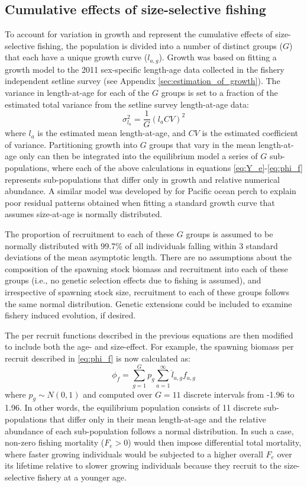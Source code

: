 \subsection*{Cumulative effects of size-selective fishing} %
\label{sub:cumulative_effects_of_size_selective_fishing}
To account for variation in growth and represent the cumulative effects of size-selective fishing, the population is divided into a number of distinct groups ($G$) that each have a unique growth curve ($l_{a,g}$).  Growth was based on fitting a growth model to the 2011 sex-specific length-age data collected in the fishery independent setline survey (see Appendix \ref{sec:estimation_of_growth}). The variance in length-at-age for each of the $G$ groups is set to a fraction of the estimated total variance from  the setline survey length-at-age data:
\[
 \sigma_{l_a}^2 = \frac{1}{G} (l_a CV)^2
\]
where $l_a$ is the estimated mean length-at-age, and $CV$ is the estimated coefficient of variance.  Partitioning growth  into $G$  groups that vary in the mean length-at-age only can then be integrated into the equilibrium model a series of $G$ sub-populations, where each of the above calculations in equations \eqref{eq:Y_e}-\eqref{eq:phi_f} represents sub-populations that differ only in growth and relative numerical abundance. A similar model was developed by \cite{mulligan1992length} for Pacific ocean perch to explain poor residual patterns obtained when fitting a standard growth curve that assumes size-at-age is normally distributed.

The proportion of recruitment to each of these $G$ groups is assumed to be normally distributed with 99.7\% of all individuals falling within 3 standard deviations of the mean asymptotic length.  There are no assumptions about the composition of the spawning stock biomass and recruitment into each of these groups (i.e., no genetic selection effects due to fishing is assumed), and irrespective of spawning stock size, recruitment to each of these groups follows the same normal distribution.  Genetic extensions could be included to examine fishery induced evolution, if desired.

The per recruit functions described in the previous equations are then modified to include both the age- and size-effect.  For example, the spawning biomass per recruit described in \eqref{eq:phi_f} is now calculated as:
\begin{equation}
	\phi_{f} =\sum_{g=1}^G p_g \sum_{a=1}^\infty \acute{l}_{a,g} f_{a,g}\label{eq:phi_fg}
\end{equation}
where $p_g \sim N(0,1)$ and computed over $G=11$ discrete intervals from -1.96 to 1.96.  In other words, the equilibrium population consists of 11 discrete sub-populations that differ only in their mean length-at-age and the relative abundance of each sub-population follows a normal distribution.  In such a case, non-zero fishing mortality  ($F_e>0$) would then impose differential total mortality, where faster growing individuals would be subjected to a higher overall $F_e$ over its lifetime relative to slower growing individuals because they recruit to the size-selective fishery at a younger age.

